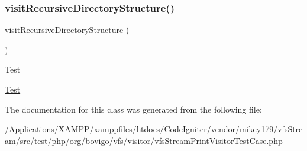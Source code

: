 \subsubsection{\texorpdfstring{visit\+Recursive\+Directory\+Structure()}{visitRecursiveDirectoryStructure()}}
{\footnotesize\ttfamily visit\+Recursive\+Directory\+Structure (\begin{DoxyParamCaption}{ }\end{DoxyParamCaption})}

\begin{DoxyRefDesc}{Test}
\item[\mbox{\hyperlink{test__test000298}{Test}}]\end{DoxyRefDesc}


The documentation for this class was generated from the following file\+:\begin{DoxyCompactItemize}
\item 
/\+Applications/\+X\+A\+M\+P\+P/xamppfiles/htdocs/\+Code\+Igniter/vendor/mikey179/vfs\+Stream/src/test/php/org/bovigo/vfs/visitor/\mbox{\hyperlink{vfs_stream_print_visitor_test_case_8php}{vfs\+Stream\+Print\+Visitor\+Test\+Case.\+php}}\end{DoxyCompactItemize}
